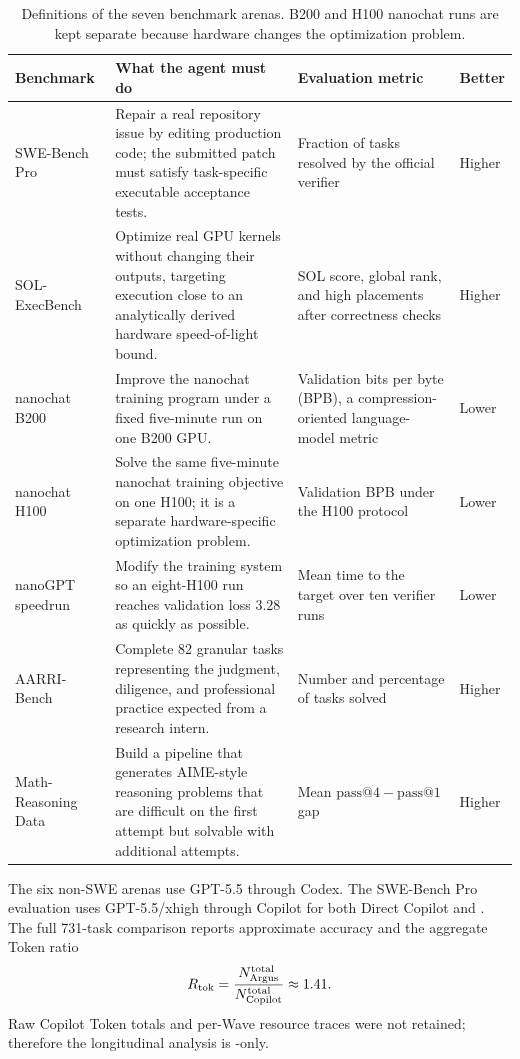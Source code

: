 \begin{table}[H]
\centering
\footnotesize
\renewcommand{\arraystretch}{1.16}
\begin{tabularx}{\linewidth}{@{}p{2.15cm} X p{3.25cm} p{1.05cm}@{}}
\toprule
\rowcolor{papersand}
\textbf{Benchmark} & \textbf{What the agent must do} & \textbf{Evaluation metric} & \textbf{Better} \\
\midrule
SWE-Bench Pro & Repair a real repository issue by editing production code; the submitted patch must satisfy task-specific executable acceptance tests. & Fraction of tasks resolved by the official verifier & Higher \\
SOL-ExecBench & Optimize real GPU kernels without changing their outputs, targeting execution close to an analytically derived hardware speed-of-light bound. & SOL score, global rank, and high placements after correctness checks & Higher \\
nanochat B200 & Improve the nanochat training program under a fixed five-minute run on one B200 GPU. & Validation bits per byte (BPB), a compression-oriented language-model metric & Lower \\
nanochat H100 & Solve the same five-minute nanochat training objective on one H100; it is a separate hardware-specific optimization problem. & Validation BPB under the H100 protocol & Lower \\
nanoGPT speedrun & Modify the training system so an eight-H100 run reaches validation loss $3.28$ as quickly as possible. & Mean time to the target over ten verifier runs & Lower \\
AARRI-Bench & Complete 82 granular tasks representing the judgment, diligence, and professional practice expected from a research intern. & Number and percentage of tasks solved & Higher \\
Math-Reasoning Data & Build a pipeline that generates AIME-style reasoning problems that are difficult on the first attempt but solvable with additional attempts. & Mean $\mathrm{pass@4}-\mathrm{pass@1}$ gap & Higher \\
\bottomrule
\end{tabularx}
\caption{Definitions of the seven benchmark arenas. B200 and H100 nanochat runs
are kept separate because hardware changes the optimization problem.}
\label{tab:benchmark-definitions}
\end{table}

The six non-SWE arenas use GPT-5.5 through Codex. The SWE-Bench Pro evaluation uses
GPT-5.5/xhigh through Copilot for both Direct Copilot and \systemname. The full
731-task comparison reports approximate accuracy and the aggregate Token ratio
\begin{equation}
  R_{\mathrm{tok}}
  = \frac{N_{\mathrm{Argus}}^{\mathrm{total}}}
         {N_{\mathrm{Copilot}}^{\mathrm{total}}}
  \approx 1.41.
  \label{eq:aggregate-token-ratio}
\end{equation}
Raw Copilot Token totals and per-Wave resource traces were not retained; therefore
the longitudinal analysis is \systemname-only.

